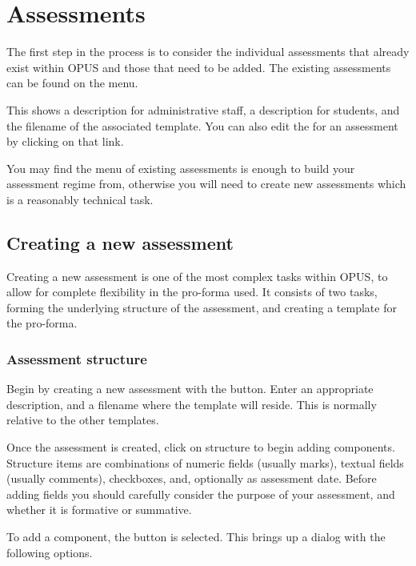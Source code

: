 \documentclass[12 pt]{book}
\begin{document}
\section{Assessments}

The first step in the process is to consider the individual assessments
that already exist within OPUS and those that need to be added. The
existing assessments can be found on the 
 menu.

This shows a description for administrative staff, a description for
students, and the filename of the associated template. You can also
edit the  for an assessment by clicking on that link.

You may find the menu of existing assessments is enough to build your
assessment regime from, otherwise you will need to create new assessments
which is a reasonably technical task.

\subsection{Creating a new assessment}

Creating a new assessment is one of the most complex tasks within OPUS,
to allow for complete flexibility in the pro-forma used. It consists of
two tasks, forming the underlying structure of the assessment, and
creating a template for the pro-forma.

\subsubsection{Assessment structure}

Begin by creating a new assessment with the  button.
Enter an appropriate description, and a filename where the template
will reside. This is normally relative to the other templates.

Once the assessment is created, click on structure to begin adding
components. Structure items are combinations of numeric fields (usually
marks), textual fields (usually comments), checkboxes, and, optionally
as assessment date. Before adding fields you should carefully consider
the purpose of your assessment, and whether it is formative or summative.

To add a component, the  button is selected. This brings
up a dialog with the following options.
\end{document}
